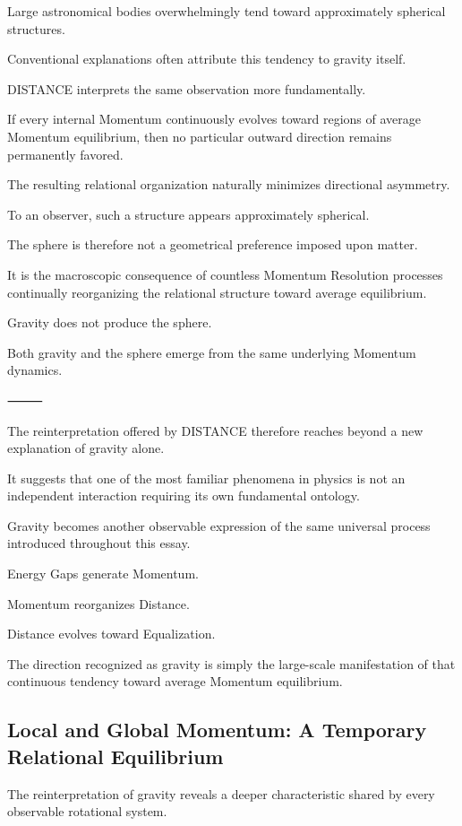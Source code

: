 Large astronomical bodies overwhelmingly tend toward approximately spherical structures.

Conventional explanations often attribute this tendency to gravity itself.

DISTANCE interprets the same observation more fundamentally.

If every internal Momentum continuously evolves toward regions of average Momentum equilibrium, then no particular outward direction remains permanently favored.

The resulting relational organization naturally minimizes directional asymmetry.

To an observer, such a structure appears approximately spherical.

The sphere is therefore not a geometrical preference imposed upon matter.

It is the macroscopic consequence of countless Momentum Resolution processes continually reorganizing the relational structure toward average equilibrium.

Gravity does not produce the sphere.

Both gravity and the sphere emerge from the same underlying Momentum dynamics.

⸻

The reinterpretation offered by DISTANCE therefore reaches beyond a new explanation of gravity alone.

It suggests that one of the most familiar phenomena in physics is not an independent interaction requiring its own fundamental ontology.

Gravity becomes another observable expression of the same universal process introduced throughout this essay.

Energy Gaps generate Momentum.

Momentum reorganizes Distance.

Distance evolves toward Equalization.

The direction recognized as gravity is simply the large-scale manifestation of that continuous tendency toward average Momentum equilibrium.

\subsection*{\textbf{Local and Global Momentum: A Temporary Relational Equilibrium}}

The reinterpretation of gravity reveals a deeper characteristic shared by every observable rotational system.

